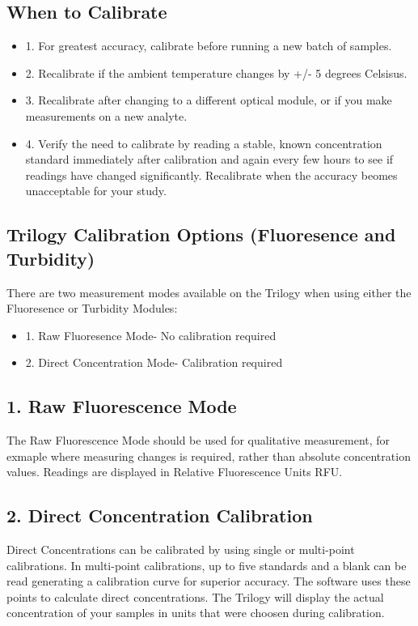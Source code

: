 \documentclass[12pt]{../SOP3_beta}\usepackage[]{graphicx}\usepackage[]{color}
\begin{document}
\subsection{When to Calibrate}
\begin{itemize}
  \item 1. For greatest accuracy, calibrate before running a new batch of samples.
  \item 2. Recalibrate if the ambient temperature changes by +/- 5 degrees Celsisus.
  \item 3. Recalibrate after changing to a different optical module, or if you make measurements on a new analyte. 
  \item 4. Verify the need to calibrate by reading a stable, known concentration standard immediately after calibration and again every few hours to see if readings have changed significantly. Recalibrate when the accuracy beomes unacceptable for your study.
\end{itemize}

\subsection{Trilogy Calibration Options (Fluoresence and Turbidity)}
\NP There are two measurement modes available on the Trilogy when using either the Fluoresence or Turbidity Modules:
\begin{itemize}
  \item 1. Raw Fluoresence Mode- No calibration required
  \item 2. Direct Concentration Mode- Calibration required 
\end{itemize}

\subsection{1. Raw Fluorescence Mode}
\NP The Raw Fluorescence Mode should be used for qualitative measurement, for exmaple where measuring changes is required, rather than absolute concentration values. Readings are displayed in Relative Fluorescence Units RFU.

\subsection{2. Direct Concentration Calibration}
\NP Direct Concentrations can be calibrated by using single or multi-point calibrations. In multi-point calibrations, up to five standards and a blank can be read generating a calibration curve for superior accuracy. The software uses these points to calculate direct concentrations. The Trilogy will display the actual concentration of your samples in units that were choosen during calibration. 
\end{document}
